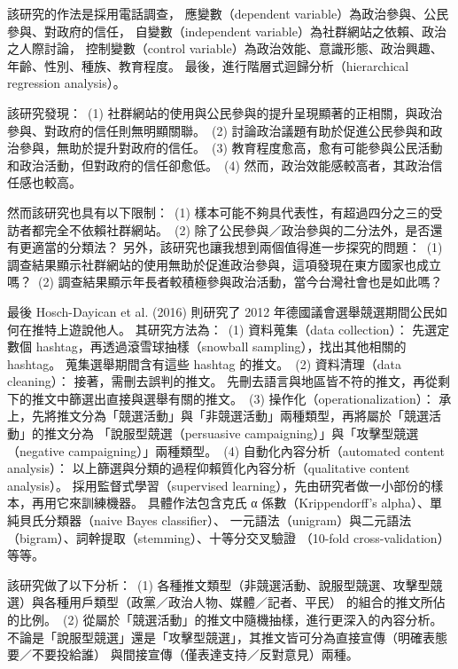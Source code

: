 \documentclass[letterpaper, 10pt, conference]{ieeeconf}   %
\begin{document}
\begin{CJK}{UTF8}{bsmi}
該研究的作法是採用電話調查，%
應變數（dependent variable）為政治參與、公民參與、對政府的信任，%
自變數（independent variable）為社群網站之依賴、政治之人際討論，%
控制變數（control variable）為政治效能、意識形態、政治興趣、年齡、性別、種族、教育程度。%
最後，進行階層式迴歸分析（hierarchical regression analysis）。%

該研究發現：%
\,(1) 社群網站的使用與公民參與的提升呈現顯著的正相關，與政治參與、對政府的信任則無明顯關聯。%
\,(2) 討論政治議題有助於促進公民參與和政治參與，無助於提升對政府的信任。%
\,(3) 教育程度愈高，愈有可能參與公民活動和政治活動，但對政府的信任卻愈低。%
\,(4) 然而，政治效能感較高者，其政治信任感也較高。%

然而該研究也具有以下限制：%
\,(1) 樣本可能不夠具代表性，有超過四分之三的受訪者都完全不依賴社群網站。%
\,(2) 除了公民參與／政治參與的二分法外，是否還有更適當的分類法？%
另外，該研究也讓我想到兩個值得進一步探究的問題：%
\,(1) 調查結果顯示社群網站的使用無助於促進政治參與，這項發現在東方國家也成立嗎？%
\,(2) 調查結果顯示年長者較積極參與政治活動，當今台灣社會也是如此嗎？%

最後 Hosch-Dayican et al. (2016) 則研究了 2012 年德國議會選舉競選期間公民如何在推特上遊說他人。\cite{c3} %
其研究方法為：%
\,(1) 資料蒐集（data collection）：%
先選定數個 hashtag，再透過滾雪球抽樣（snowball sampling），找出其他相關的 hashtag。%
蒐集選舉期間含有這些 hashtag 的推文。%
\,(2) 資料清理（data cleaning）：%
接著，需刪去誤判的推文。%
先刪去語言與地區皆不符的推文，再從剩下的推文中篩選出直接與選舉有關的推文。%
\,(3) 操作化（operationalization）：%
承上，先將推文分為「競選活動」與「非競選活動」兩種類型，再將屬於「競選活動」的推文分為%
「說服型競選（persuasive campaigning）」與「攻擊型競選（negative campaigning）」兩種類型。%
\,(4) 自動化內容分析（automated content analysis）：%
以上篩選與分類的過程仰賴質化內容分析（qualitative content analysis）。%
採用監督式學習（supervised learning），先由研究者做一小部份的樣本，再用它來訓練機器。%
具體作法包含克氏 α 係數（Krippendorff's alpha）、單純貝氏分類器（naive Bayes classifier）、%
一元語法（unigram）與二元語法（bigram）、詞幹提取（stemming）、十等分交叉驗證%
（10-fold cross-validation）等等。%

該研究做了以下分析：%
\,(1) 各種推文類型（非競選活動、說服型競選、攻擊型競選）與各種用戶類型（政黨／政治人物、媒體／記者、平民）%
的組合的推文所佔的比例。%
\,(2) 從屬於「競選活動」的推文中隨機抽樣，進行更深入的內容分析。%
不論是「說服型競選」還是「攻擊型競選」，其推文皆可分為直接宣傳（明確表態要／不要投給誰）%
與間接宣傳（僅表達支持／反對意見）兩種。%


\end{CJK}
\end{document}
